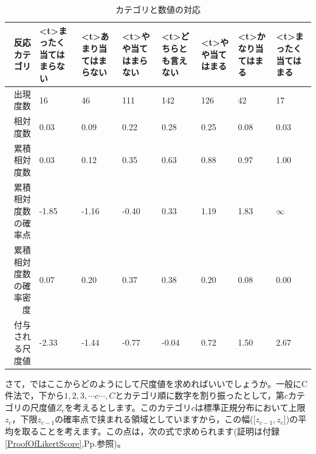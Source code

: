 \documentclass{ltjsbook}
\begin{document}
\begin{table}[ht]
	\centering
	\caption{カテゴリと数値の対応}
	\begin{tabular}{rp{1cm}p{1cm}p{1cm}p{1cm}p{1cm}p{1cm}p{1cm}}
		\hline
		反応カテゴリ      & \pbox<t>{\small{まったく当てはまらない}} & \pbox<t>{\small{あまり当てはまらない}} & \pbox<t>{\small{やや当てはまらない}} & \pbox<t>{\small{どちらとも言えない}} & \pbox<t>{\small{やや当てはまる}} & \pbox<t>{\small{かなり当てはまる}} & \pbox<t>{\small{まったく当てはまる}} \\
		\hline
		出現度数        & 16                            & 46                           & 111                         & 142                         & 126                       & 42                         & 17                          \\
		相対度数        & 0.03                          & 0.09                         & 0.22                        & 0.28                        & 0.25                      & 0.08                       & 0.03                        \\
		累積相対度数      & 0.03                          & 0.12                         & 0.35                        & 0.63                        & 0.88                      & 0.97                       & 1.00                        \\
		累積相対度数の確率点  & -1.85                         & -1.16                        & -0.40                       & 0.33                        & 1.19                      & 1.83                       & $\infty$                    \\
		累積相対度数の確率密度 & 0.07                          & 0.20                         & 0.37                        & 0.38                        & 0.20                      & 0.08                       & 0.00                        \\
		付与される尺度値    & -2.33                         & -1.44                        & -0.77                       & -0.04                       & 0.72                      & 1.50                       & 2.67                        \\
		\hline
	\end{tabular}
	\label{tbl::02_01}
\end{table}

さて，ではここからどのようにして尺度値を求めればいいでしょうか。一般にC件法で，下から$1,2,3,\cdots c\cdots, C$とカテゴリ順に数字を割り振ったとして，第$c$カテゴリの尺度値$Z_c$を考えるとします。このカテゴリ$c$は標準正規分布において上限$z_c$，下限$z_{c-1}$の確率点で挟まれる領域としていますから，この幅([$z_{c-1} , z_c$])の平均を取ることを考えます。この点は，次の式で求められます(証明は付録\ref{ProofOfLikertScore},Pp.\pageref{ProofOfLikertScore}参照)。
\end{document}

